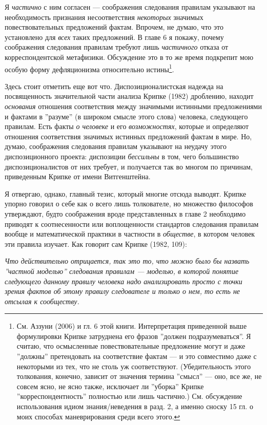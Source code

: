 \documentclass[12pt]{book}
\begin{document}
\smallskip

Я \textit{частично} с ним согласен --- соображения следования правилам указывают на необходимость признания несоответствия \textit{некоторых} значимых повествовательных предложений фактам. Впрочем, не думаю, что это установлено для \textit{всех} таких предложений. В главе 6 я покажу, почему соображения следования правилам требуют лишь \textit{частичного} отказа от корреспондентской метафизики. Обсуждение это в то же время подкрепит мою особую форму дефляционизма относительно истины\footnote{См. Аззуни (2006) и гл. 6 этой книги. Интерпретация приведенной выше формулировки Крипке затруднена его фразов ''должен подразумеваться''. Я считаю, что осмысленные повествовательные предложение могут и даже ''должны'' претендовать на соответствие фактам --- и это совместимо даже с некоторыми из тех, что не столь уж соответствуют. (Убедительность этого толкования, конечно, зависит от значения термина ''смысл'' --- оно, все же, не совсем ясно, не ясно также, исключает ли ''уборка'' Крипке ''корреспондентность'' полностью или лишь частично.) См. обсуждение использования идиом знания/неведения в разд. 2, а именно сноску 15 гл. о моих способах маневрирования среди всего этого.}.

Здесь стоит отметить еще вот что. Диспозиционалистская надежда на посвященность значительной части анализа Крипке (1982) дроблению, находит \textit{основания} отношения соответствия между значимыми истинными предложениями и фактами в ''разуме'' (в широком смысле этого слова) человека, следующего правилам. Есть факты \textit{о человеке} и его \textit{возможностях}, которые и определяют отношения соответствия значимых истинных предложений фактам в мире. Но, думаю, соображения следования правилам указывают на неудачу этого диспозиционного проекта: диспозиции \textit{бессильны} в том, чего большинство диспозиционалистов от них требует, и получается так во многом по причинам, приведенным Крипке от имени Витгенштейна.

Я отвергаю, однако, главный тезис, который многие отсюда выводят. Крипке упорно говорил о себе как о всего лишь толкователе, но множество философов утверждают, будто соображения вроде представленных в главе 2 необходимо приводят к соотнесенности или воплощенности стандартов следования правилам вообще и математической практики в частности в \textit{обществе}, в котором человек эти правила изучает. Как говорит сам Крипке (1982, 109):

\smallskip

\textit{Что действительно отрицается, так это то, что можно было бы назвать ''частной моделью'' следования правилам --- моделью, в которой понятие следующего данному правилу человека надо анализировать просто с точки зрения фактов об этому правилу следователе и только о нем, то есть не отсылая к сообществу.}
\end{document}
